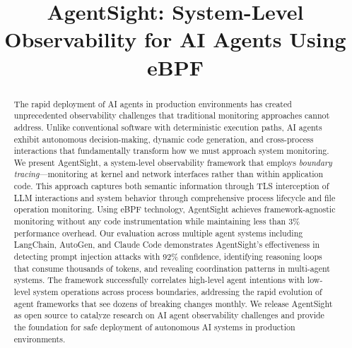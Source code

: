 \documentclass[sigplan,screen,review,9pt]{acmart}
\begin{document}
\title{AgentSight: System-Level Observability for AI Agents Using eBPF}


\author{}


\sloppy
\begin{abstract}
The rapid deployment of AI agents in production environments has created unprecedented observability challenges that traditional monitoring approaches cannot address. Unlike conventional software with deterministic execution paths, AI agents exhibit autonomous decision-making, dynamic code generation, and cross-process interactions that fundamentally transform how we must approach system monitoring. We present AgentSight, a system-level observability framework that employs \emph{boundary tracing}—monitoring at kernel and network interfaces rather than within application code. This approach captures both semantic information through TLS interception of LLM interactions and system behavior through comprehensive process lifecycle and file operation monitoring. Using eBPF technology, AgentSight achieves framework-agnostic monitoring without any code instrumentation while maintaining less than 3\% performance overhead. Our evaluation across multiple agent systems including LangChain, AutoGen, and Claude Code demonstrates AgentSight's effectiveness in detecting prompt injection attacks with 92\% confidence, identifying reasoning loops that consume thousands of tokens, and revealing coordination patterns in multi-agent systems. The framework successfully correlates high-level agent intentions with low-level system operations across process boundaries, addressing the rapid evolution of agent frameworks that see dozens of breaking changes monthly. We release AgentSight as open source to catalyze research on AI agent observability challenges and provide the foundation for safe deployment of autonomous AI systems in production environments.
\end{abstract}


\maketitle








\end{document}
